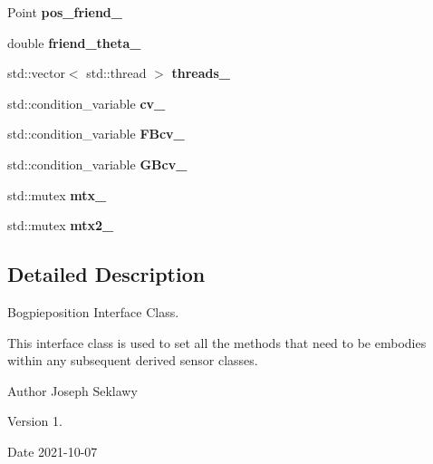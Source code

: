 \begin{DoxyCompactItemize}
\mbox{\label{classBogieposInterface_a033c04b5ccf5753d998d429ca3d9e557}} 
Point {\bfseries pos\+\_\+friend\+\_\+}
\item 
\mbox{\label{classBogieposInterface_a8e8826e05c8ac240093b2278e241579f}} 
double {\bfseries friend\+\_\+theta\+\_\+}
\item 
\mbox{\label{classBogieposInterface_afeb37637f67ddeb44bfa8916c512e5d5}} 
std\+::vector$<$ std\+::thread $>$ {\bfseries threads\+\_\+}
\item 
\mbox{\label{classBogieposInterface_a91170e4a4f7b4b1b5ce8af5070e48162}} 
std\+::condition\+\_\+variable {\bfseries cv\+\_\+}
\item 
\mbox{\label{classBogieposInterface_a721c81d1b0c28dd1849b311654bcc427}} 
std\+::condition\+\_\+variable {\bfseries F\+Bcv\+\_\+}
\item 
\mbox{\label{classBogieposInterface_afd6361c4d8c896f52eddfffaca18df6b}} 
std\+::condition\+\_\+variable {\bfseries G\+Bcv\+\_\+}
\item 
\mbox{\label{classBogieposInterface_a01943e42e9d6279885f51de115158db9}} 
std\+::mutex {\bfseries mtx\+\_\+}
\item 
\mbox{\label{classBogieposInterface_a013edcb6bc5eb8b238b307fe71594230}} 
std\+::mutex {\bfseries mtx2\+\_\+}
\end{DoxyCompactItemize}


\subsection{Detailed Description}
Bogpieposition Interface Class. 

This interface class is used to set all the methods that need to be embodies within any subsequent derived sensor classes. \begin{DoxyAuthor}{Author}
Joseph Seklawy 
\end{DoxyAuthor}
\begin{DoxyVersion}{Version}
1. 
\end{DoxyVersion}
\begin{DoxyDate}{Date}
2021-\/10-\/07 
\end{DoxyDate}


